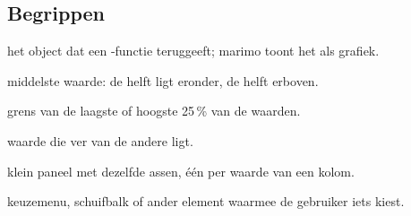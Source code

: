 \documentclass[11pt,a4paper]{article}
\begin{document}
\subsection*{Begrippen}

\begin{description}[leftmargin=3.2cm, labelwidth=3.0cm, font=\normalfont\bfseries]
  \item[figuur] het object dat een -functie teruggeeft; marimo toont het als grafiek.
  \item[mediaan] middelste waarde: de helft ligt eronder, de helft erboven.
  \item[kwartiel] grens van de laagste of hoogste 25\,\% van de waarden.
  \item[uitschieter] waarde die ver van de andere ligt.
  \item[facet] klein paneel met dezelfde assen, één per waarde van een kolom.
  \item[UI-element] keuzemenu, schuifbalk of ander element waarmee de gebruiker iets kiest.
\end{description}
\end{document}
